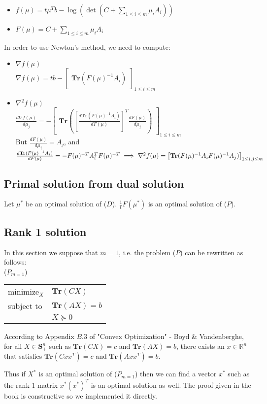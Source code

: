 \documentclass{article}
\begin{document}
\begin{itemize}
	\item $f(\mu) = t \mu^T b - \log(\det(C + \sum_{1 \leq i \leq m} \mu_i A_i))$
	\item $F(\mu) = C + \sum_{1 \leq i \leq m} \mu_i A_i$
\end{itemize}

In order to use Newton's method, we need to compute: \begin{itemize}
	\item $\nabla f(\mu)$ \\
	$\nabla f(\mu) = t b - \begin{bmatrix}
	\mathbf{Tr}(F(\mu)^{-1} A_i)
	\end{bmatrix}_{1 \leq i \leq m}$
	\item $\nabla^2 f(\mu)$ \\
	$\frac{d \nabla f(\mu)}{d \mu_j} = - \begin{bmatrix}
	\mathbf{Tr}([\frac{d \mathbf{Tr}(F(\mu)^{-1} A_i)}{dF(\mu)}]^T \frac{d F(\mu)}{d \mu_j})
	\end{bmatrix}_{1 \leq i \leq m}$ \\
	But $\frac{d F(\mu)}{d \mu_j} = A_j$, and $\frac{d \mathbf{Tr}(F(\mu)^{-1} A_i)}{dF(\mu)} = - F(\mu)^{-T} A_i^T F(\mu)^{-T} \\
	\implies \nabla^2 f(\mu) = \begin{bmatrix}
	\mathbf{Tr}(F(\mu)^{-1} A_i F(\mu)^{-1} A_j)
	\end{bmatrix}_{1 \leq i, j \leq m}$
\end{itemize}

\subsection{Primal solution from dual solution}

Let $\mu^*$ be an optimal solution of ($D$). $\frac{1}{t} F(\mu^*)$ is an optimal solution of ($P$).

\subsection{Rank 1 solution}

In this section we suppose that $m = 1$, i.e. the problem ($P$) can be rewritten as follows: \\
($P_{m = 1}$)\begin{tabular}{l l}
	minimize$_{X}$ & $\mathbf{Tr}(C X)$ \\
	subject to & $\mathbf{Tr}(A X) = b$ \\
	& $X \succeq 0$  
\end{tabular}

According to Appendix $B.3$ of "Convex Optimization" - Boyd \& Vandenberghe, for all $X \in \mathbf{S}^n_+$ such as $\mathbf{Tr}(C X) = c$ and $\mathbf{Tr}(A X) = b$, there exists an $x \in \mathbb{R}^n$ that satisfies $\mathbf{Tr}(C x x^T) = c$ and $\mathbf{Tr}(A x x^T) = b$. 

Thus if $X^*$ is an optimal solution of ($P_{m = 1}$) then we can find a vector $x^*$ such as the rank $1$ matrix $x^* (x^*)^T$ is an optimal solution as well. The proof given in the book is constructive so we implemented it directly.
\end{document}
